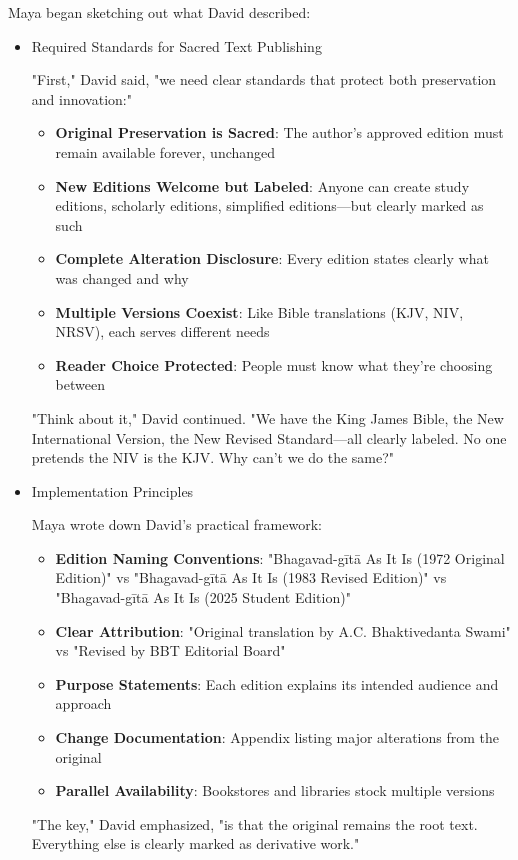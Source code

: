 \documentclass[11pt,twoside]{book}
\begin{document}
Maya began sketching out what David described:
\begin{itemize}
\item Required Standards for Sacred Text Publishing
\label{sec:orge4dcf1a}

"First," David said, "we need clear standards that protect both preservation and innovation:"

\begin{itemize}
\item \textbf{\textbf{Original Preservation is Sacred}}: The author's approved edition must remain available forever, unchanged
\item \textbf{\textbf{New Editions Welcome but Labeled}}: Anyone can create study editions, scholarly editions, simplified editions—but clearly marked as such
\item \textbf{\textbf{Complete Alteration Disclosure}}: Every edition states clearly what was changed and why
\item \textbf{\textbf{Multiple Versions Coexist}}: Like Bible translations (KJV, NIV, NRSV), each serves different needs
\item \textbf{\textbf{Reader Choice Protected}}: People must know what they're choosing between
\end{itemize}

"Think about it," David continued. "We have the King James Bible, the New International Version, the New Revised Standard—all clearly labeled. No one pretends the NIV is the KJV. Why can't we do the same?"
\item Implementation Principles
\label{sec:org1c0ffca}

Maya wrote down David's practical framework:

\begin{itemize}
\item \textbf{\textbf{Edition Naming Conventions}}: "Bhagavad-gītā As It Is (1972 Original Edition)" vs "Bhagavad-gītā As It Is (1983 Revised Edition)" vs "Bhagavad-gītā As It Is (2025 Student Edition)"
\item \textbf{\textbf{Clear Attribution}}: "Original translation by A.C. Bhaktivedanta Swami" vs "Revised by BBT Editorial Board"
\item \textbf{\textbf{Purpose Statements}}: Each edition explains its intended audience and approach
\item \textbf{\textbf{Change Documentation}}: Appendix listing major alterations from the original
\item \textbf{\textbf{Parallel Availability}}: Bookstores and libraries stock multiple versions
\end{itemize}

"The key," David emphasized, "is that the original remains the root text. Everything else is clearly marked as derivative work."
\end{itemize}
\end{document}
